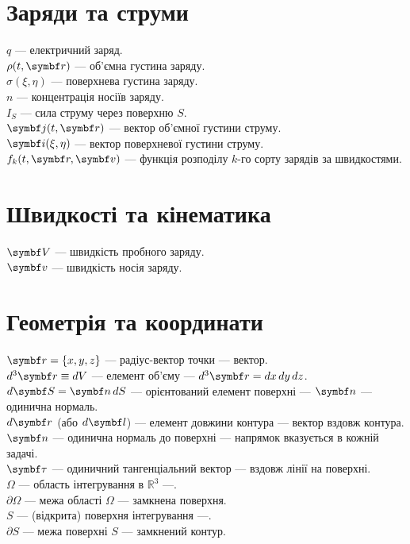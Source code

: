\documentclass[%
biblatex,
]{ConspectBook}
\begin{document}
\section*{Заряди та струми}


  $q$ ---  електричний заряд.\\
  $\rho(t,\vect{r})$ ---  об'ємна густина заряду.\\
  $\sigma(\xi,\eta)$ ---  поверхнева густина заряду.\\
  $n$ ---  концентрація носіїв заряду.\\
  $I_S$ ---  сила струму через поверхню $S$.\\
  $\vect{j}(t,\vect{r})$ ---  вектор об'ємної густини струму.\\
  $\vect{i}(\xi,\eta)$ ---  вектор поверхневої густини струму.\\
  $f_k(t,\vect{r},\vect{v})$ ---  функція розподілу $k$-го сорту зарядів за швидкостями.\\


\section*{Швидкості та кінематика}


  $\vect{V}$ ---  швидкість пробного заряду.\\
  $\vect{v}$ ---  швидкість носія заряду.\\


\section*{Геометрія та координати}


  $\vect{r}=\{x,y,z\}$ ---  радіус-вектор точки ---  вектор.\\
  $d^3\vect{r} \equiv dV$ ---  елемент об'єму ---  $d^3\vect{r} = dx\,dy\,dz$.\\
  $d\vect{S} = \vect{n}\,dS$ ---  орієнтований елемент поверхні ---  $\vect{n}$ --- одинична нормаль.\\
  $d\vect{r}$ (або $d\vect{l}$) ---  елемент довжини контура ---  вектор вздовж контура.\\
  $\vect{n}$ ---  одинична нормаль до поверхні ---  напрямок вказується в кожній задачі.\\
  $\vect{\tau}$ ---  одиничний тангенціальний вектор ---  вздовж лінії на поверхні.\\
  $\Omega$ ---  область інтегрування в $\mathbb{R}^3$ ---.\\
  $\partial\Omega$ ---  межа області $\Omega$ ---  замкнена поверхня.\\
  $S$ ---  (відкрита) поверхня інтегрування ---.\\
  $\partial S$ ---  межа поверхні $S$ ---  замкнений контур.\\
\end{document}

